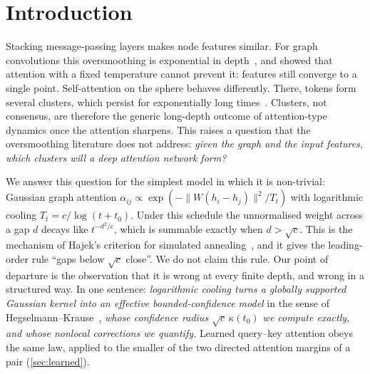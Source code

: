 \documentclass[10pt]{article}
\theoremstyle{definition}
\theoremstyle{remark}
\begin{document}
\section{Introduction}\label{sec:intro}

Stacking message-passing layers makes node features similar. For graph convolutions this oversmoothing is
exponential in depth~\citep{li2018,oono2020,cai2020,rusch2023}, and \citet{wu2023} showed that attention with a fixed
temperature cannot prevent it: features still converge to a single point. Self-attention on the sphere behaves
differently. There, tokens form several clusters, which persist for exponentially long times~\citep{geshkovski2023,
geshkovski2024metastable,bruno2025}. Clusters, not consensus, are therefore the generic long-depth outcome of
attention-type dynamics once the attention sharpens. This raises a question that the oversmoothing literature does not
address: \emph{given the graph and the input features, which clusters will a deep attention network form?}

We answer this question for the simplest model in which it is non-trivial: Gaussian graph attention
$\alpha_{ij}\propto\exp(-\|W(h_i-h_j)\|^2/T_t)$ with logarithmic cooling $T_t=c/\log(t+t_0)$. Under this
schedule the unnormalised weight across a gap $d$ decays like $t^{-d^2/c}$, which is summable exactly when $d>\sqrt c$.
This is the mechanism of Hajek's criterion for simulated annealing~\citep{hajek1988,geman1984}, and it gives the leading-order
rule ``gaps below $\sqrt c$ close''. We do not claim this rule. Our point of departure is the observation that it is
wrong at every finite depth, and wrong in a structured way. In one sentence: \emph{logarithmic cooling turns a globally
supported Gaussian kernel into an effective bounded-confidence model} in the sense of
Hegselmann--Krause~\citep{hegselmann2002,blondel2009}, \emph{whose confidence radius $\sqrt c\,\kappa(t_0)$ we compute
exactly, and whose nonlocal corrections we quantify.} Learned query--key attention obeys the same law, applied to the smaller of
the two directed attention margins of a pair (\cref{sec:learned}).
\end{document}
